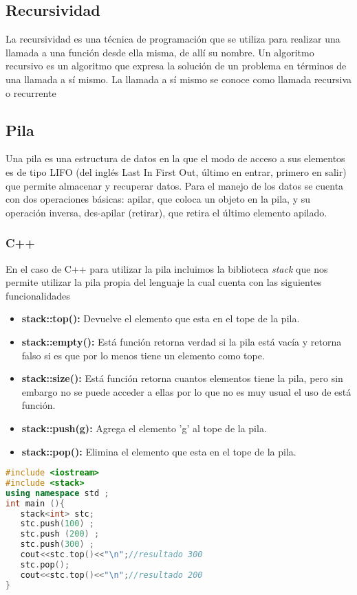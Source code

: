 \subsection{Recursividad}
La recursividad es una técnica de programación que se utiliza para realizar una llamada a una
función desde ella misma, de allí su nombre. Un algoritmo recursivo es un algoritmo que expresa la solución de un problema en términos de una llamada a sí mismo. La llamada a sí mismo se conoce como llamada recursiva o recurrente

\subsection{Pila}

Una pila es una estructura de datos en la que el modo de acceso a sus elementos es de tipo LIFO (del
inglés Last In First Out, último en entrar, primero en salir) que permite almacenar y recuperar datos.
Para el manejo de los datos se cuenta con dos operaciones básicas: apilar, que coloca un objeto en
la pila, y su operación inversa, des-apilar (retirar), que retira el último elemento apilado.

\subsubsection{C++}

En el caso de C++ para utilizar la pila incluimos la biblioteca \emph{stack} que nos permite utilizar la pila propia del lenguaje la cual cuenta con las siguientes funcionalidades

\begin{itemize}
	\item \textbf{stack::top():} Devuelve el elemento que esta en el tope de la pila.
	\item \textbf{stack::empty():} Está función retorna verdad si la pila está vacía y retorna falso si es que por lo menos
tiene un elemento como tope.
	\item \textbf{stack::size():} Está función retorna cuantos elementos tiene la pila, pero sin embargo no se puede
acceder a ellas por lo que no es muy usual el uso de está función.
	\item \textbf{stack::push(g):} Agrega el elemento 'g' al tope de la pila.
	\item \textbf{stack::pop():} Elimina el elemento que esta en el tope de la pila.
\end{itemize}

\begin{lstlisting}[language=C++]
#include <iostream>
#include <stack>
using namespace std ;
int main (){
   stack<int> stc;
   stc.push(100) ;
   stc.push (200) ;
   stc.push(300) ;
   cout<<stc.top()<<"\n";//resultado 300
   stc.pop();
   cout<<stc.top()<<"\n";//resultado 200
}
\end{lstlisting}


